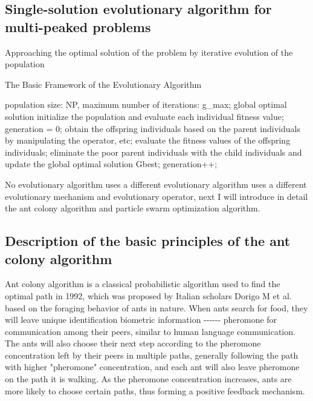\documentclass[twocolumn]{article}
\begin{document}
\subsection{Single-solution evolutionary algorithm for multi-peaked problems}

Approaching the optimal solution of the problem by iterative evolution
of the population


\begin{algorithm}[H]
	\caption{The Basic Framework of the Evolutionary Algorithm}
	\label{alg:Framwork}
	\begin{algorithmic}[1]
		\Require
		population size: NP, maximum number of iterations: g\_max;
		\Ensure
		global optimal solution
		\State 
		initialize the population and evaluate each individual fitness value;
		\State
		generation = 0;
		\State
		obtain the offspring individuals based on the parent individuals by
		manipulating the operator, etc;
		\State
		evaluate the fitness values of the offspring individuals;
		\State
		eliminate the poor parent individuals with the child individuals and
		update the global optimal solution Gbest;
		\State
		generation++;
		\EndWhile
	\end{algorithmic}
	\label{code}
\end{algorithm}

No evolutionary algorithm uses a different evolutionary algorithm uses a
different evolutionary mechanism and evolutionary operator, next I will
introduce in detail the ant colony algorithm and particle swarm
optimization algorithm.

\subsection{Description of the basic principles of the ant colony algorithm}


Ant colony algorithm is a classical probabilistic algorithm used to find
the optimal path in 1992, which was proposed by Italian scholars Dorigo
M et al. based on the foraging behavior of ants in nature. When ants
search for food, they will leave unique identification biometric
information -\/-\/-\/-\/-\/- pheromone for communication among their
peers, similar to human language communication. The ants will also
choose their next step according to the pheromone concentration left by
their peers in multiple paths, generally following the path with higher
"pheromone" concentration, and each ant will also leave pheromone on the
path it is walking. As the pheromone concentration increases, ants are
more likely to choose certain paths, thus forming a positive feedback
mechanism.
\end{document}
